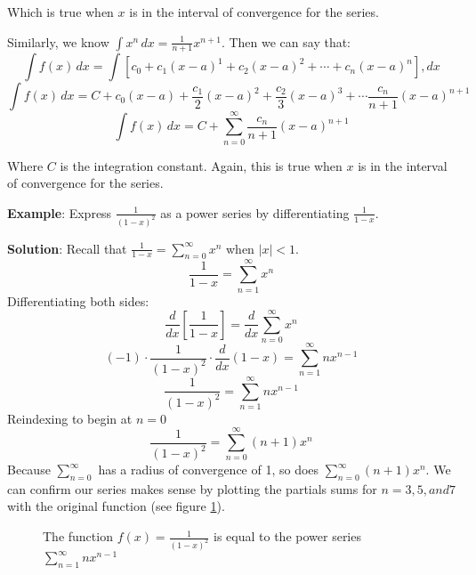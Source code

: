 Which is true when $x$ is in the interval of convergence for the series. 

Similarly, we know $\int x^n\,dx = \frac{1}{n+1}x^{n+1}$. Then we can say that:
$$\int f(x) \,dx = \int \left[c_0 + c_1(x-a)^1 + c_2(x-a)^2 + \cdots + c_n(x-a)
^n\right],dx$$
$$\int f(x)\,dx = C + c_0(x-a) + \frac{c_1}{2}(x-a)^2 + \frac{c_2}{3}(x-a)^3 + 
\cdots \frac{c_n}{n+1}(x-a)^{n+1}$$
$$\int f(x)\,dx = C + \sum_{n=0}^\infty \frac{c_n}{n+1}(x-a)^{n+1}$$

Where $C$ is the integration constant. Again, this is true when $x$ is in the 
interval of convergence for the series. 

\textbf{Example}: Express $\frac{1}{(1-x)^2}$ as a power series by 
differentiating $\frac{1}{1-x}$. 

\textbf{Solution}: Recall that $\frac{1}{1-x} = \sum_{n=0}^\infty x^n$ when 
$|x|<1$. 
$$\frac{1}{1-x} = \sum_{n=1}^\infty x^n$$
Differentiating both sides:
$$\frac{d}{dx} \left[ \frac{1}{1-x} \right] = \frac{d}{dx} \sum_{n=0}^\infty 
x^n$$
$$(-1) \cdot \frac{1}{(1-x)^2} \cdot \frac{d}{dx}(1-x) = \sum_{n=1}^\infty 
nx^{n-1}$$
$$\frac{1}{(1-x)^2} = \sum_{n=1}^\infty nx^{n-1}$$
Reindexing to begin at $n = 0$
$$\frac{1}{(1-x)^2} = \sum_{n=0}^\infty (n+1)x^n$$
Because $\sum_{n=0}^\infty$ has a radius of convergence of 1, so does $\sum_{
n=0}^\infty (n+1)x^n$. We can confirm our series makes sense by plotting the 
partials sums for $n = 3, 5, and 7$ with the original function (see figure 
\ref{power1}).

\begin{figure}[htbp]
\centering
    \caption{The function $f(x) = \frac{1}{(1-x)^2}$ is equal to the power 
    series $\sum_{n=1}^\infty nx^{n-1}$}
    \label{power1}
\end{figure}

